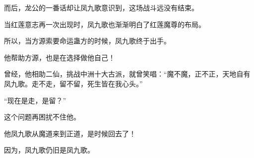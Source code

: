 \begin{this_body}
而后，龙公的一番话却让凤九歌意识到，这场战斗远没有结束。

当红莲意志再一次出现时，凤九歌也渐渐明白了红莲魔尊的布局。

所以，当方源索要命运蛊方的时候，凤九歌终于出手。

他帮助方源，也是在选择做他自己！

曾经，他相助二仙，挑战中洲十大古派，就曾笑唱：“魔不魔，正不正，天地自有凤九歌。走不走，留不留，死生皆在我心头。”

“现在是走，是留？”

这个问题再困扰不住他。

他凤九歌从魔道来到正道，是时候回去了！

因为，凤九歌仍旧是凤九歌。

\end{this_body}

